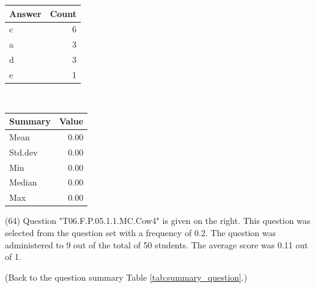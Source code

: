 \documentclass[12pt,english,nohyper]{tufte-handout}\usepackage[]{graphicx}\usepackage[]{color}
\begin{document}
\begin{center}%
\begin{tabular}{lr}
  \hline
Answer & Count \\ 
  \hline
c &   6 \\ 
  a &   3 \\ 
  d &   3 \\ 
  e &   1 \\ 
   \hline
\end{tabular}
~~~~~~~~%
\begin{tabular}{lr}
  \hline
Summary & Value \\ 
  \hline
Mean & 0.00 \\ 
  Std.dev & 0.00 \\ 
  Min & 0.00 \\ 
  Median & 0.00 \\ 
  Max & 0.00 \\ 
   \hline
\end{tabular}
\end{center}\newpage{} (64) Question "T06.F.P.05.1.1.MC.Cow4" is given on the right. This question was selected from the question set with a frequency of 0.2. The question was administered to 9 out of the total of 50 students. The average score was 0.11 out of 1.

 (Back to the question summary Table \ref{tab:summary_question}.)
\end{document}
